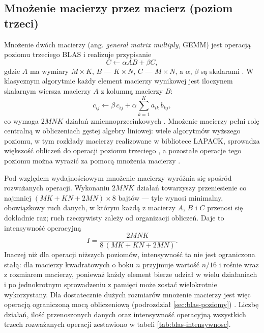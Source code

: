 \documentclass[a4paper,12pt]{book} %
\begin{document}
\subsection{Mnożenie macierzy przez macierz (poziom trzeci)}
\label{sec:op-gemm}

Mnożenie dwóch macierzy (ang. \emph{general matrix multiply}, GEMM) jest operacją poziomu trzeciego BLAS i realizuje przypisanie
\[
  C \leftarrow \alpha A B + \beta C,
\]
gdzie $A$ ma wymiary $M \times K$, $B$ --- $K \times N$, $C$ --- $M \times N$, a $\alpha$, $\beta$ są skalarami \cite{dongarra1990blas3}. W klasycznym algorytmie każdy element macierzy wynikowej jest iloczynem skalarnym wiersza macierzy $A$ z kolumną macierzy $B$:
\[
  c_{ij} \leftarrow \beta\, c_{ij} + \alpha \sum_{k=1}^{K} a_{ik}\, b_{kj},
\]
co wymaga $2MNK$ działań zmiennoprzecinkowych \cite{golub2013matrix}. Mnożenie macierzy pełni rolę centralną w obliczeniach gęstej algebry liniowej: wiele algorytmów wyższego poziomu, w tym rozkłady macierzy realizowane w bibliotece LAPACK, sprowadza większość obliczeń do operacji poziomu trzeciego \cite{blackford2002blas,goto2008anatomy}, a pozostałe operacje tego poziomu można wyrazić za pomocą mnożenia macierzy \cite{kagstrom1998gemm}.

Pod względem wydajnościowym mnożenie macierzy wyróżnia się spośród rozważanych operacji. Wykonaniu $2MNK$ działań towarzyszy przeniesienie co najmniej $(MK + KN + 2MN)\times 8$ bajtów --- tyle wynosi minimalny, obowiązkowy ruch danych, w którym każdą z macierzy $A$, $B$ i $C$ przenosi się dokładnie raz; ruch rzeczywisty zależy od organizacji obliczeń. Daje to intensywność operacyjną
\[
  I = \frac{2MNK}{8\,(MK + KN + 2MN)}.
\]
Inaczej niż dla operacji niższych poziomów, intensywność ta nie jest ograniczona stałą: dla macierzy kwadratowych o boku $n$ przyjmuje wartość $n/16$ i rośnie wraz z rozmiarem macierzy, ponieważ każdy element bierze udział w wielu działaniach i po jednokrotnym sprowadzeniu z pamięci może zostać wielokrotnie wykorzystany. Dla dostatecznie dużych rozmiarów mnożenie macierzy jest więc operacją ograniczoną mocą obliczeniową (podrozdział \ref{sec:blas-poziomy}) \cite{williams2009roofline}. Liczbę działań, ilość przenoszonych danych oraz intensywność operacyjną wszystkich trzech rozważanych operacji zestawiono w tabeli \ref{tab:blas-intensywnosc}.
\end{document}
